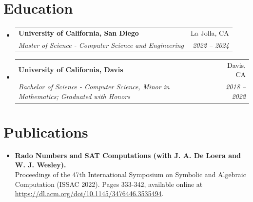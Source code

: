 \documentclass[a4paper]{article}
\makeatletter
\newcommand{\resumeItem}[2]{
  \item\small{
    \textbf{#1}{: #2 \vspace{-2pt}}
  }
}
\newcommand{\resumeSubheading}[4]{
  \vspace{-1pt}\item
    \begin{tabular*}{0.97\textwidth}[t]{l@{\extracolsep{\fill}}r}
      \textbf{#1} & #2 \\
      \textit{#3} & \textit{#4} \\
    \end{tabular*}\vspace{-5pt}
}
\newcommand{\resumeSubItem}[2]{\resumeItem{#1}{#2}\vspace{-3pt}}
\newcommand{\resumeSubHeadingListStart}{\begin{itemize}[leftmargin=*]}
\newcommand{\resumeSubHeadingListEnd}{\end{itemize}}
\makeatother
\begin{document}
\section{Education}
  \resumeSubHeadingListStart
    \resumeSubheading
        {University of California, San Diego}{La Jolla, CA}
        {Master of Science - Computer Science and Engineering}{2022 -- 2024}
    \resumeSubheading
      {University of California, Davis}{Davis, CA}
    {Bachelor of Science - Computer Science, Minor in Mathematics; Graduated with Honors}{2018 -- 2022}
    \resumeSubHeadingListEnd
\vspace{-3pt}
    
	    

\section{Publications}
\resumeSubHeadingListStart
\item \textbf{Rado Numbers and SAT Computations (with J. A. De Loera and W. J. Wesley).}\\ Proceedings of the 47th International Symposium on Symbolic and Algebraic Computation (ISSAC 2022). Pages 333-342, available online at \href{https://dl.acm.org/doi/10.1145/3476446.3535494}{https://dl.acm.org/doi/10.1145/3476446.3535494}.
\resumeSubHeadingListEnd
\vspace{-7pt}
\end{document}
